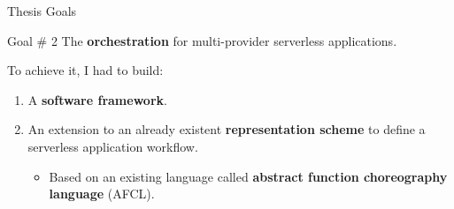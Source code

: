 \documentclass[13.5pt]{beamer}
\newcommand{\B}[1]{\textcolor{TorVergataColor}{\textbf{#1}}}
\begin{document}
\begin{frame}{Thesis Goals}
	
	\begin{block}{Goal $\#$ 2}
		\centering
		The \B{orchestration} for multi-provider serverless applications. 
	\end{block}
	
	\vspace{\baselineskip}
	To achieve it, I had to build:
	\vspace{\baselineskip}

	\begin{enumerate}
		\justifying
	
		\item A \B{software framework}.
		
		\vspace{\baselineskip} 
		\item An extension to an already existent \B{representation scheme} to define a serverless application workflow.
		\begin{itemize}
			\item Based on an existing language called \B{abstract function choreography language} (AFCL).
		\end{itemize}
		
	\end{enumerate}
	
\end{frame} 


\end{document}
